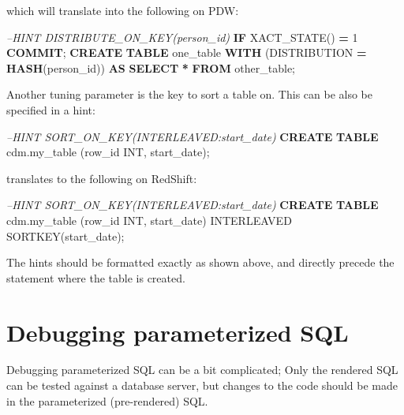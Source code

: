 \documentclass[
]{article}
\newenvironment{Shaded}{\begin{snugshade}}{\end{snugshade}}
\newcommand{\CommentTok}[1]{\textcolor[rgb]{0.56,0.35,0.01}{\textit{#1}}}
\newcommand{\ControlFlowTok}[1]{\textcolor[rgb]{0.13,0.29,0.53}{\textbf{#1}}}
\newcommand{\DataTypeTok}[1]{\textcolor[rgb]{0.13,0.29,0.53}{#1}}
\newcommand{\DecValTok}[1]{\textcolor[rgb]{0.00,0.00,0.81}{#1}}
\newcommand{\KeywordTok}[1]{\textcolor[rgb]{0.13,0.29,0.53}{\textbf{#1}}}
\newcommand{\NormalTok}[1]{#1}
\newcommand{\OperatorTok}[1]{\textcolor[rgb]{0.81,0.36,0.00}{\textbf{#1}}}
\begin{document}
which will translate into the following on PDW:

\begin{Shaded}
\begin{Highlighting}[]
\CommentTok{--HINT DISTRIBUTE_ON_KEY(person_id)}
\ControlFlowTok{IF}\NormalTok{ XACT_STATE() }\OperatorTok{=} \DecValTok{1} \KeywordTok{COMMIT}\NormalTok{; }
\KeywordTok{CREATE} \KeywordTok{TABLE}\NormalTok{ one_table }\KeywordTok{WITH}\NormalTok{ (DISTRIBUTION }\OperatorTok{=} \KeywordTok{HASH}\NormalTok{(person_id)) }\KeywordTok{AS}
\KeywordTok{SELECT} \OperatorTok{*} \KeywordTok{FROM}\NormalTok{ other_table;}
\end{Highlighting}
\end{Shaded}

Another tuning parameter is the key to sort a table on. This can be also
be specified in a hint:

\begin{Shaded}
\begin{Highlighting}[]
\CommentTok{--HINT SORT_ON_KEY(INTERLEAVED:start_date)}
\KeywordTok{CREATE} \KeywordTok{TABLE}\NormalTok{ cdm.my_table (row_id }\DataTypeTok{INT}\NormalTok{, start_date);}
\end{Highlighting}
\end{Shaded}

translates to the following on RedShift:

\begin{Shaded}
\begin{Highlighting}[]
\CommentTok{--HINT SORT_ON_KEY(INTERLEAVED:start_date)}
\KeywordTok{CREATE} \KeywordTok{TABLE}\NormalTok{ cdm.my_table (row_id }\DataTypeTok{INT}\NormalTok{, start_date)}
\NormalTok{INTERLEAVED SORTKEY(start_date);}
\end{Highlighting}
\end{Shaded}

The hints should be formatted exactly as shown above, and directly
precede the statement where the table is created.

\hypertarget{debugging-parameterized-sql}{%
\section{Debugging parameterized
SQL}\label{debugging-parameterized-sql}}

Debugging parameterized SQL can be a bit complicated; Only the rendered
SQL can be tested against a database server, but changes to the code
should be made in the parameterized (pre-rendered) SQL.
\end{document}
